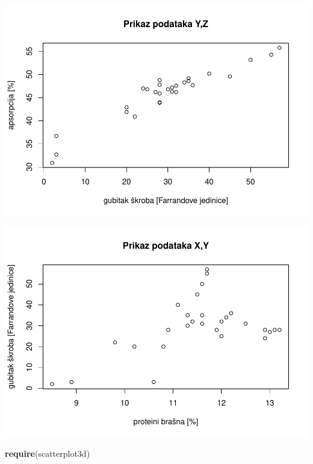 \documentclass[]{article}
\newenvironment{Shaded}{\begin{snugshade}}{\end{snugshade}}
\newcommand{\KeywordTok}[1]{\textcolor[rgb]{0.13,0.29,0.53}{\textbf{{#1}}}}
\newcommand{\DataTypeTok}[1]{\textcolor[rgb]{0.13,0.29,0.53}{{#1}}}
\newcommand{\StringTok}[1]{\textcolor[rgb]{0.31,0.60,0.02}{{#1}}}
\newcommand{\NormalTok}[1]{{#1}}
\begin{document}
\includegraphics{Izvjestaj_files/figure-latex/unnamed-chunk-24-2.pdf}

\begin{Shaded}
\end{Shaded}

\includegraphics{Izvjestaj_files/figure-latex/unnamed-chunk-24-3.pdf}

\begin{Shaded}
\begin{Highlighting}[]
\KeywordTok{require}\NormalTok{(scatterplot3d)}
\end{Highlighting}
\end{Shaded}
\end{document}
